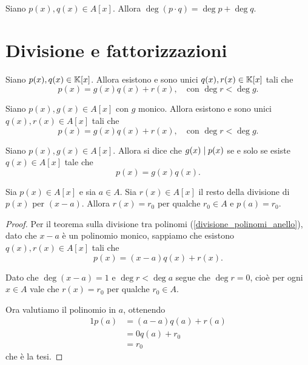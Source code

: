 \begin{proposition}\label{grado_prodotto_somma_gradi}
    Siano $p(x), q(x) \in A[x]$. Allora $\deg (p \cdot q) = \deg p + \deg q$.
\end{proposition}

\section{Divisione e fattorizzazioni}

\begin{theorem}
    Siano $p(x), q(x) \in \mathbb{K}[x]$. Allora esistono e sono unici $q(x), r(x) \in \mathbb{K}[x]$ tali che \begin{equation}
        p(x) = g(x)q(x) + r(x), \quad \text{con } \deg r < \deg g.
    \end{equation} 
\end{theorem}

\begin{proposition}\label{divisione_polinomi}
    Siano $p(x), g(x) \in A[x]$ con $g$ monico. Allora esistono e sono unici $q(x), r(x) \in A[x]$ tali che \begin{equation}
        p(x) = g(x)q(x) + r(x), \quad \text{con } \deg r < \deg g.
    \end{equation} 
\end{proposition}

\begin{definition}\label{divisione_polinomi_anello}
    Siano $p(x), g(x) \in A[x]$. Allora si dice che $g(x) \mid p(x)$ se e solo se esiste $q(x) \in A[x]$ tale che \[
        p(x) = g(x)q(x).    
    \]
\end{definition}

\begin{proposition}\label{resto_uguale_valutazione_nel_punto}
    Sia $p(x) \in A[x]$ e sia $a \in A$. Sia $r(x) \in A[x]$ il resto della divisione di $p(x)$ per $(x-a)$. Allora $r(x) = r_0$ per qualche $r_0 \in A$ e $p(a) = r_0$.
\end{proposition}
\begin{proof}
    Per il teorema sulla divisione tra polinomi (\ref{divisione_polinomi_anello}), dato che $x-a$ è un polinomio monico, sappiamo che esistono $q(x), r(x) \in A[x]$ tali che \[
        p(x) = (x-a)q(x) + r(x).
    \]

    Dato che $\deg (x - a) = 1$ e $\deg r < \deg a$ segue che $\deg r = 0$, cioè per ogni $x \in A$ vale che $r(x) = r_0$ per qualche $r_0 \in A$.

    Ora valutiamo il polinomio in $a$, ottenendo \begin{alignat*}
        {1}
        p(a) &= (a-a)q(a) + r(a)\\
        &= 0q(a) + r_0\\
        &= r_0
    \end{alignat*}
    che è la tesi.
\end{proof}

